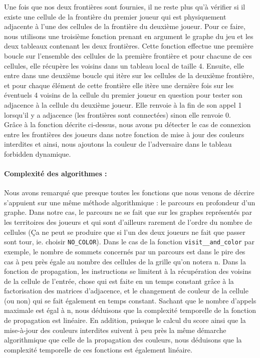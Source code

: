 \documentclass[11pt]{article}
\begin{document}
Une fois que nos deux frontières sont fournies, il ne reste plus qu'à vérifier si il existe une cellule de la frontière du premier joueur qui est physiquement adjacente à l'une des cellules de la frontière du deuxième joueur. Pour ce faire, nous utilisons une troisième fonction prenant en argument le graphe du jeu et les deux tableaux contenant les deux frontières. Cette fonction effectue une première boucle sur l'ensemble des cellules de la première frontière et pour chacune de ces cellules, elle récupère les voisins dans un tableau local de taille 4. Ensuite, elle entre dans une deuxième boucle qui itère sur les cellules de la deuxième frontière, et pour chaque élément de cette frontière elle itère une dernière fois sur les éventuels 4 voisins de la cellule du premier joueur en question pour tester son adjacence à la cellule du deuxième joueur. Elle renvoie à la fin de son appel 1 lorsqu'il y a adjacence (les frontières sont connectées) sinon elle renvoie 0.\\


Grâce à la fonction décrite ci-dessus, nous avons pu détecter le cas de connexion entre les frontières des joueurs dans notre fonction de mise à jour des couleurs interdites et ainsi, nous ajoutons la couleur de l'adversaire dans le tableau forbidden dynamique.\\

\paragraph{Complexité des algorithmes : \\}
Nous avons remarqué que presque toutes les fonctions que nous venons de décrire s'appuient sur une même méthode algorithmique : le parcours en profondeur d'un graphe. Dans notre cas, le parcours ne se fait que sur les graphes représentés par les territoires des joueurs et qui sont d'ailleurs rarement de l'ordre du nombre de cellules (Ça ne peut se produire que si l'un des deux joueurs ne fait que passer sont tour, ie. choisir \texttt{NO\_COLOR}). Dans le cas de la fonction \texttt{visit\_\_and\_color} par exemple, le nombre de sommets concernés par un parcours est dans le pire des cas à peu près égale au nombre des cellules de la grille qu'on notera n. Dans la fonction de propagation, les instructions se limitent à la récupération des voisins de la cellule de l'entrée, chose qui est faite en un temps constant grâce à la factorisation des matrices d'adjacence, et le changement de couleur de la cellule (ou non) qui se fait également en temps constant. Sachant que le nombre d'appels maximale est égal à n, nous déduisons que la complexité temporelle de la fonction de propagation est linéaire. En addition, puisque le calcul du score ainsi que la mise-à-jour des couleurs interdites suivent à peu près la même démarche algorithmique que celle de la propagation des couleurs, nous déduisons que la complexité temporelle de ces fonctions est également linéaire.
\end{document}
